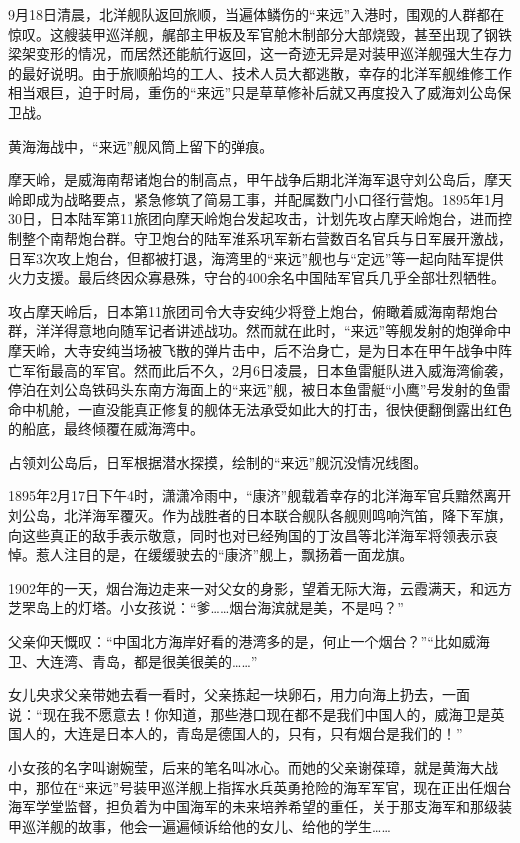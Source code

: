 \documentclass[12pt,UTF8]{ctexbook}
\begin{document}
9月18日清晨，北洋舰队返回旅顺，当遍体鳞伤的“来远”入港时，围观的人群都在惊叹。这艘装甲巡洋舰，艉部主甲板及军官舱木制部分大部烧毁，甚至出现了钢铁梁架变形的情况，而居然还能航行返回，这一奇迹无异是对装甲巡洋舰强大生存力的最好说明。由于旅顺船坞的工人、技术人员大都逃散，幸存的北洋军舰维修工作相当艰巨，迫于时局，重伤的“来远”只是草草修补后就又再度投入了威海刘公岛保卫战。

黄海海战中，“来远”舰风筒上留下的弹痕。

摩天岭，是威海南帮诸炮台的制高点，甲午战争后期北洋海军退守刘公岛后，摩天岭即成为战略要点，紧急修筑了简易工事，并配属数门小口径行营炮。1895年1月30日，日本陆军第11旅团向摩天岭炮台发起攻击，计划先攻占摩天岭炮台，进而控制整个南帮炮台群。守卫炮台的陆军淮系巩军新右营数百名官兵与日军展开激战，日军3次攻上炮台，但都被打退，海湾里的“来远”舰也与“定远”等一起向陆军提供火力支援。最后终因众寡悬殊，守台的400余名中国陆军官兵几乎全部壮烈牺牲。

攻占摩天岭后，日本第11旅团司令大寺安纯少将登上炮台，俯瞰着威海南帮炮台群，洋洋得意地向随军记者讲述战功。然而就在此时，“来远”等舰发射的炮弹命中摩天岭，大寺安纯当场被飞散的弹片击中，后不治身亡，是为日本在甲午战争中阵亡军衔最高的军官。然而此后不久，2月6日凌晨，日本鱼雷艇队进入威海湾偷袭，停泊在刘公岛铁码头东南方海面上的“来远”舰，被日本鱼雷艇“小鹰”号发射的鱼雷命中机舱，一直没能真正修复的舰体无法承受如此大的打击，很快便翻倒露出红色的船底，最终倾覆在威海湾中。

占领刘公岛后，日军根据潜水探摸，绘制的“来远”舰沉没情况线图。

1895年2月17日下午4时，潇潇冷雨中，“康济”舰载着幸存的北洋海军官兵黯然离开刘公岛，北洋海军覆灭。作为战胜者的日本联合舰队各舰则鸣响汽笛，降下军旗，向这些真正的敌手表示敬意，同时也对已经殉国的丁汝昌等北洋海军将领表示哀悼。惹人注目的是，在缓缓驶去的“康济”舰上，飘扬着一面龙旗。

1902年的一天，烟台海边走来一对父女的身影，望着无际大海，云霞满天，和远方芝罘岛上的灯塔。小女孩说：“爹……烟台海滨就是美，不是吗？”

父亲仰天慨叹：“中国北方海岸好看的港湾多的是，何止一个烟台？”“比如威海卫、大连湾、青岛，都是很美很美的……”

女儿央求父亲带她去看一看时，父亲拣起一块卵石，用力向海上扔去，一面说：“现在我不愿意去！你知道，那些港口现在都不是我们中国人的，威海卫是英国人的，大连是日本人的，青岛是德国人的，只有，只有烟台是我们的！”

小女孩的名字叫谢婉莹，后来的笔名叫冰心。而她的父亲谢葆璋，就是黄海大战中，那位在“来远”号装甲巡洋舰上指挥水兵英勇抢险的海军军官，现在正出任烟台海军学堂监督，担负着为中国海军的未来培养希望的重任，关于那支海军和那级装甲巡洋舰的故事，他会一遍遍倾诉给他的女儿、给他的学生……
\end{document}
